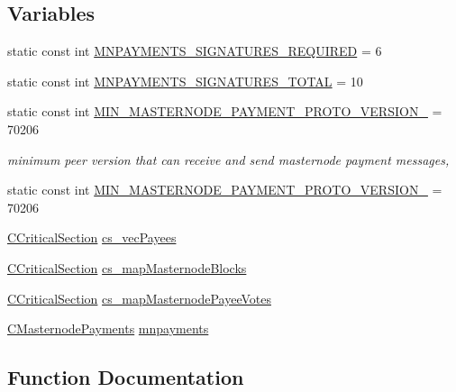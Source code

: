 \subsection*{Variables}
\begin{DoxyCompactItemize}
\item 
static const int \mbox{\hyperlink{masternode-payments_8h_aee4296d2886eb994c149795e80d42d7e}{M\+N\+P\+A\+Y\+M\+E\+N\+T\+S\+\_\+\+S\+I\+G\+N\+A\+T\+U\+R\+E\+S\+\_\+\+R\+E\+Q\+U\+I\+R\+ED}} = 6
\item 
static const int \mbox{\hyperlink{masternode-payments_8h_a05e13919c270de268e28afc0227a9c2c}{M\+N\+P\+A\+Y\+M\+E\+N\+T\+S\+\_\+\+S\+I\+G\+N\+A\+T\+U\+R\+E\+S\+\_\+\+T\+O\+T\+AL}} = 10
\item 
static const int \mbox{\hyperlink{masternode-payments_8h_a55c7b4ef12706994a2185e9dc7e773b1}{M\+I\+N\+\_\+\+M\+A\+S\+T\+E\+R\+N\+O\+D\+E\+\_\+\+P\+A\+Y\+M\+E\+N\+T\+\_\+\+P\+R\+O\+T\+O\+\_\+\+V\+E\+R\+S\+I\+O\+N\+\_}} = 70206
\begin{DoxyCompactList}\small\item\em minimum peer version that can receive and send masternode payment messages, \end{DoxyCompactList}\item 
static const int \mbox{\hyperlink{masternode-payments_8h_aa1f4489ed173ce38197edb296f385d5e}{M\+I\+N\+\_\+\+M\+A\+S\+T\+E\+R\+N\+O\+D\+E\+\_\+\+P\+A\+Y\+M\+E\+N\+T\+\_\+\+P\+R\+O\+T\+O\+\_\+\+V\+E\+R\+S\+I\+O\+N\+\_}} = 70206
\item 
\mbox{\hyperlink{sync_8h_a37a4692b2d517f2843655ca11af7668a}{C\+Critical\+Section}} \mbox{\hyperlink{masternode-payments_8h_a51764240f42529c755c09fbbcf6203c4}{cs\+\_\+vec\+Payees}}
\item 
\mbox{\hyperlink{sync_8h_a37a4692b2d517f2843655ca11af7668a}{C\+Critical\+Section}} \mbox{\hyperlink{masternode-payments_8h_aac327e3a251800c22ec67bfa9534c838}{cs\+\_\+map\+Masternode\+Blocks}}
\item 
\mbox{\hyperlink{sync_8h_a37a4692b2d517f2843655ca11af7668a}{C\+Critical\+Section}} \mbox{\hyperlink{masternode-payments_8h_a50c9d39685d2d650800068de85c593c4}{cs\+\_\+map\+Masternode\+Payee\+Votes}}
\item 
\mbox{\hyperlink{class_c_masternode_payments}{C\+Masternode\+Payments}} \mbox{\hyperlink{masternode-payments_8h_ab15235ecb957ac017b2a372923b90765}{mnpayments}}
\end{DoxyCompactItemize}


\subsection{Function Documentation}
\mbox{\label{masternode-payments_8h_a1a60010ef73db581ad54a165770391c6}} 
